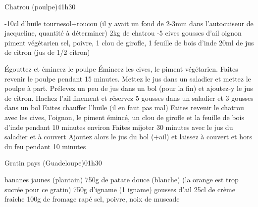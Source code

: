 {\renewcommand{\section}[1]{}

\section{Chatrou (poulpe)}
\begin{recette}{Chatrou (poulpe)}{4}{1h30}{}
\begin{ingredients}
-10cl d'huile tournesol+roucou (il y avait un fond de 2-3mm dans l'autocuiseur de jacqueline, quantité à déterminer)
\ingredient 2kg de chatrou
-5 cives
 gousses d'ail
 oignon
 piment végétarien
\ingredient sel, poivre, 1 clou de girofle, 1 feuille de bois d'inde
\ingredient 20ml de jus de citron (jus de 1/2 citron)
\end{ingredients}

\begin{preparation}
\etape Égouttez et émincez le poulpe
\etape Émincez les cives, le piment végétarien.
\etape Faites revenir le poulpe pendant 15 minutes. Mettez le jus dans un saladier et mettez le poulpe à part.
\etape Prélevez un peu de jus dans un bol (pour la fin) et ajoutez-y le jus de citron. 
\etape Hachez l'ail finement et réservez 5 gousses dans un saladier et 3 gousses dans un bol
\etape Faites chauffer l'huile (il en faut pas mal)
\etape Faites revenir le chatrou avec les cives, l'oignon, le piment émincé, un clou de girofle et la feuille de bois d'inde pendant 10 minutes environ
\etape Faites mijoter 30 minutes avec le jus du saladier et à couvert
\etape Ajoutez alors le jus du bol (+ail) et laissez à couvert et hors du feu pendant 10 minutes

\end{preparation}
\end{recette}


\section{Gratin pays (Guadeloupe)}
\begin{recette}{Gratin pays (Guadeloupe)}{0}{1h30}{}
\begin{ingredients}
 bananes jaunes (plantain)
\ingredient 750g de patate douce (blanche) (la orange est trop sucrée pour ce gratin)
\ingredient 750g d'igname (1 igname)
 gousses d'ail
\ingredient 25cl de crème fraiche %
\ingredient 100g de fromage rapé
\ingredient sel, poivre, noix de muscade
\end{ingredients}


\end{recette}}
